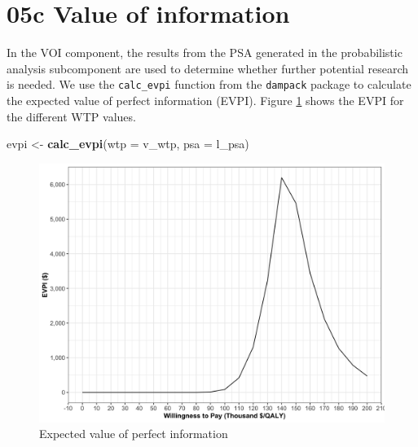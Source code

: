 \documentclass[]{book}
\newenvironment{Shaded}{\begin{snugshade}}{\end{snugshade}}
\newcommand{\KeywordTok}[1]{\textcolor[rgb]{0.13,0.29,0.53}{\textbf{#1}}}
\newcommand{\DataTypeTok}[1]{\textcolor[rgb]{0.13,0.29,0.53}{#1}}
\newcommand{\StringTok}[1]{\textcolor[rgb]{0.31,0.60,0.02}{#1}}
\newcommand{\NormalTok}[1]{#1}
\begin{document}
\section{05c Value of information}\label{voi}

In the VOI component, the results from the PSA generated in the
probabilistic analysis subcomponent are used to determine whether
further potential research is needed. We use the \texttt{calc\_evpi}
function from the \texttt{dampack} package to calculate the expected
value of perfect information (EVPI). Figure \ref{fig:05c-evpi} shows the
EVPI for the different WTP values.

\begin{Shaded}
\begin{Highlighting}[]
\NormalTok{evpi <-}\StringTok{ }\KeywordTok{calc_evpi}\NormalTok{(}\DataTypeTok{wtp =}\NormalTok{ v_wtp, }\DataTypeTok{psa =}\NormalTok{ l_psa)}
\end{Highlighting}
\end{Shaded}

\begin{figure}

{\centering \includegraphics[width=33.33in]{../figs/05c_evpi} 

}

\caption{Expected value of perfect information}\label{fig:05c-evpi}
\end{figure}


\end{document}
